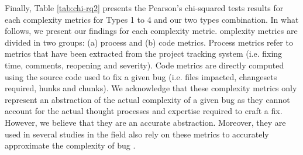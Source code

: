 Finally, Table \ref{tab:chi-rq2} presents the Pearson's chi-squared tests results for each complexity metrics for Types 1 to 4 and our two types combination.
In what follows, we present our findings for each complexity metric.
omplexity metrics are divided in two groups: (a) process and (b) code metrics.
Process metrics refer to metrics that have been extracted from the project tracking system (i.e. fixing time, comments, reopening and severity).
Code metrics are directly computed using the source code used to fix a given bug (i.e. files impacted, changesets required, hunks and chunks).
We acknowledge that these complexity metrics only represent an abstraction of the actual complexity of a given bug as they cannot account for the actual thought processes and expertise required to craft a fix.
However, we believe that they are an accurate abstraction.
Moreover, they are used in several studies in the field also rely on these metrics to accurately approximate the complexity of bug \cite{Weiß2007,Saha2014,Nam2013,Anvik2006,Nagappan}.

